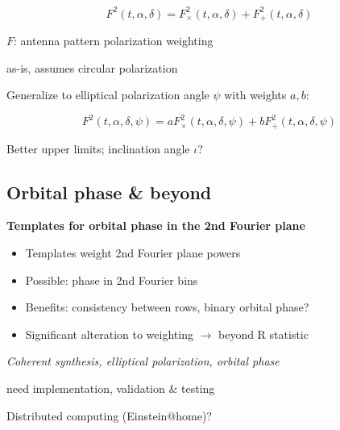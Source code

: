 \[
F^{2}(t,\alpha,\delta)=F_{\times}^{2}(t,\alpha,\delta)+F_{+}^{2}(t,\alpha,\delta)
\]



$F$: antenna pattern polarization weighting 


as-is, assumes circular polarization


Generalize to elliptical polarization angle $\psi$ with weights $a,b$:


\[
F^{2}(t,\alpha,\delta,\psi)=aF_{\times}^{2}(t,\alpha,\delta,\psi)+bF_{+}^{2}(t,\alpha,\delta,\psi)
\]



Better upper limits; inclination angle $\iota$?


\subsection{Orbital phase \& beyond}


\textbf{Templates for orbital phase in the 2nd Fourier plane}
\begin{itemize}
\item Templates weight 2nd Fourier plane powers
\item Possible: phase in 2nd Fourier bins
\item Benefits: consistency between rows, binary orbital phase?
\item Significant alteration to weighting $\rightarrow$ beyond R statistic
\end{itemize}

\emph{Coherent synthesis, elliptical polarization, orbital phase}


need implementation, validation \& testing


Distributed computing (Einstein@home)?





